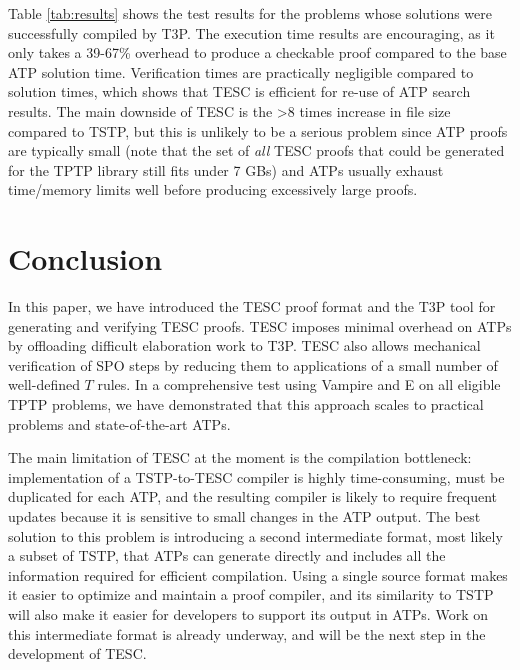 \documentclass[12pt]{article}
\begin{document}
Table \ref{tab:results} shows the test results for the problems whose solutions
were successfully compiled by T3P. The execution time results are 
encouraging, as it only takes a 39-67\% overhead to produce a checkable proof compared to the base
ATP solution time. Verification times are practically negligible compared to solution times, which
shows that TESC is efficient for re-use of ATP search results. The main downside of TESC is the 
>8 times increase in file size compared to TSTP, but this is unlikely to be a serious problem 
since ATP proofs are typically small (note that the set of \textit{all} TESC proofs that could be 
generated for the TPTP library still fits under 7 GBs) and ATPs usually exhaust
time/memory limits well before producing excessively large proofs.


\section{Conclusion}  \label{sec:conclusion}

In this paper, we have introduced the TESC proof format and the T3P tool for generating and verifying TESC proofs. 
TESC imposes minimal overhead on ATPs by offloading difficult elaboration work to T3P. 
TESC also allows mechanical verification of SPO steps by reducing them to applications of a small number of well-defined $T$ rules.
In a comprehensive test using Vampire and E on all eligible TPTP problems, we have  
demonstrated that this approach scales to practical problems and state-of-the-art ATPs.

The main limitation of TESC at the moment is the compilation bottleneck: implementation of 
a TSTP-to-TESC compiler is highly time-consuming, must be duplicated for each ATP, and the resulting compiler is 
likely to require frequent updates because it is sensitive to small changes in the ATP output.
The best solution to this problem is introducing a second intermediate format, most likely a subset of TSTP, 
that ATPs can generate directly and includes all the information
required for efficient compilation. Using a single source format makes it easier to 
optimize and maintain a proof compiler, and its similarity to TSTP will also make it 
easier for developers to support its output in ATPs.
Work on this intermediate format is already underway, and will be the next 
step in the development of TESC.
\end{document}
